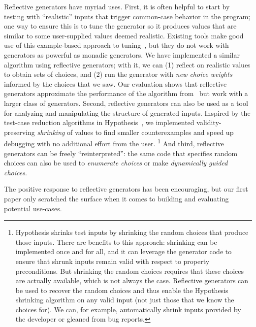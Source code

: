 Reflective generators have myriad uses. First,
%
it is often helpful to start by testing with
``realistic'' inputs that trigger common-case behavior in the program;
one way to ensure this is to tune the generator so
it produces values that are similar to some user-supplied values deemed
realistic. Existing tools make good use of this example-based approach to
tuning~\cite{soremekun2020inputs}, but they do not work with generators as
powerful as monadic generators. We have implemented a
similar algorithm using
reflective generators; with it, we can (1) reflect on realistic values to
obtain sets of choices, and (2) run the generator with {\em new choice weights}
informed by the choices that we saw. Our evaluation shows that reflective
generators approximate the performance of the algorithm
from~\cite{soremekun2020inputs} but work with a larger class of generators.
%
Second,
reflective generators can also be used as a tool for analyzing and
manipulating the structure of generated inputs. Inspired by the test-case
reduction algorithms in Hypothesis~\cite{maciver_test-case_2020}, we implemented
validity-preserving {\em shrinking} of values to find smaller counterexamples
and speed up debugging with no additional effort from the user.%
%
\footnote{%
\normalsize
Hypothesis shrinks test inputs by shrinking the random choices
that produce those
inputs. There are benefits to this approach: shrinking can be implemented
once and for all, and it can leverage the generator code to ensure that shrunk
inputs remain valid with respect to property preconditions.  But shrinking the
random choices requires that these choices are actually available, which
is not always the case. Reflective generators
can be used to
recover the random choices and thus enable the Hypothesis shrinking
algorithm on any
valid input (not just those that we know the choices for). We can, for
example, automatically shrink inputs provided by the developer or
gleaned from bug reports.  
}
%
And third, reflective generators can be freely
``reinterpreted'': the same code that specifies random choices can
also be used to {\em enumerate choices} or make {\em dynamically guided choices}.

%
The positive response to reflective generators has been
encouraging, but our first paper only scratched the surface when it comes to
building and evaluating potential use-cases.

